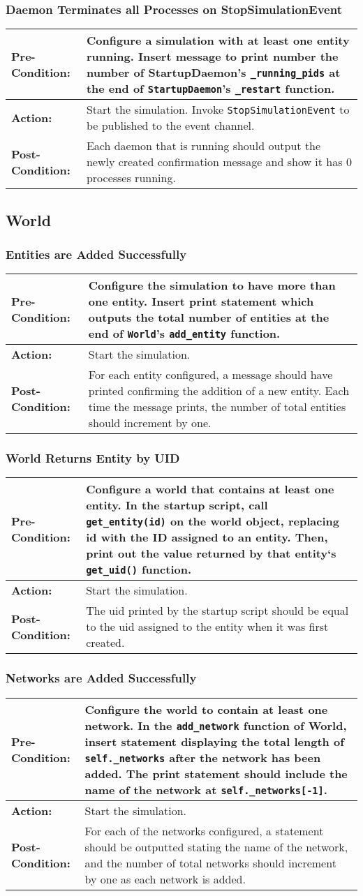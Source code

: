 \documentclass[titlepage]{article}
\newcommand{\testcase}[3]{
    \begin{center}
    \begin{tabular}{| l | p{0.7\textwidth}|}
        \hline
        \rowcolor[gray]{0.8}\textbf{Pre-Condition:} & #1 \\ \hline
        \textbf{Action:} & #2 \\ \hline
        \rowcolor[gray]{0.8}\textbf{Post-Condition:} & #3 \\ \hline
    \end{tabular}
    \end{center}
}
\begin{document}
\subsubsection{Daemon Terminates all Processes on StopSimulationEvent}
\testcase{Configure a simulation with at least one entity running.  Insert message to print number the number of StartupDaemon's \texttt{\_running\_pids} at the end of \texttt{StartupDaemon}'s \texttt{\_restart} function.}{Start the simulation. Invoke \texttt{StopSimulationEvent} to be published to the event channel.}{Each daemon that is running should output the newly created confirmation message and show it has 0 processes running.}

\subsection{World}
\subsubsection{Entities are Added Successfully}
\testcase{Configure the simulation to have more than one entity.  Insert print statement which outputs the total number of entities at the end of \texttt{World}'s \texttt{add\_entity} function.}{Start the simulation.}{For each entity configured, a message should have printed confirming the addition of a new entity.  Each time the message prints, the number of total entities should increment by one.}

\subsubsection{World Returns Entity by UID}
\testcase{Configure a world that contains at least one entity. In the startup script, call \texttt{get\_entity(id)} on the world
object, replacing id with the ID assigned to an entity. Then, print out the value returned by that entity`s  \texttt{get\_uid()} function.}{Start the simulation.}{The uid printed by the startup script should be equal to the uid assigned to the entity when it was first created.}

\subsubsection{Networks are Added Successfully}
\testcase{Configure the world to contain at least one network.  In the \texttt{add\_network} function of World, insert statement displaying the total length of \texttt{self.\_networks} after the network has been added. The print statement should include the name of the network at \texttt{self.\_networks[-1]}.}{Start the simulation.}{For each of the networks configured, a statement should be outputted stating the name of the network, and the number of total networks should increment by one as each network is added.}
\end{document}

